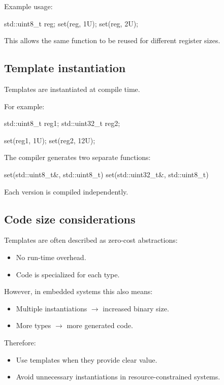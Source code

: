 \noindent Example usage:

\begin{cppcode}
std::uint8_t reg{};
set(reg, 1U);
set(reg, 2U);
\end{cppcode}

\noindent This allows the same function to be reused for different register sizes.

\subsection{Template instantiation}
\label{c5:sec:instantiation}
Templates are instantiated at compile time.

For example:

\begin{cppcode}
std::uint8_t reg1{};
std::uint32_t reg2{};

set(reg1, 1U);
set(reg2, 12U);
\end{cppcode}

\noindent The compiler generates two separate functions:

\begin{cppcode}
set(std::uint8_t&, std::uint8_t)
set(std::uint32_t&, std::uint8_t)
\end{cppcode}

\noindent Each version is compiled independently.

\subsection{Code size considerations}
\label{c5:sec:codesize}
Templates are often described as zero-cost abstractions:
\begin{itemize}
  \item No run-time overhead.
  \item Code is specialized for each type.
\end{itemize}
However, in embedded systems this also means:
\begin{itemize}
  \item Multiple instantiations $\rightarrow$ increased binary size.
  \item More types $\rightarrow$ more generated code.
\end{itemize}
Therefore:
\begin{itemize}
  \item Use templates when they provide clear value.
  \item Avoid unnecessary instantiations in resource-constrained systems.
\end{itemize}

